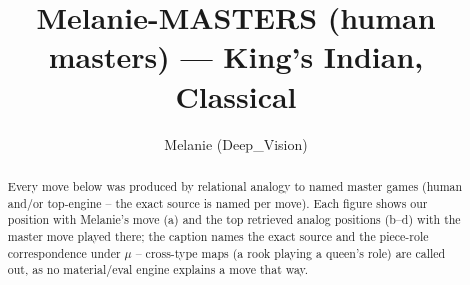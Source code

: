 \documentclass[11pt]{article}
\title{Melanie-MASTERS (human masters) — King's Indian, Classical}
\author{Melanie (Deep\_Vision)}
\date{}
\begin{document}
\maketitle

\begin{abstract}Every move below was produced by relational analogy to named master games (human and/or top-engine -- the exact source is named per move). Each figure shows our position with Melanie's move (a) and the top retrieved analog positions (b--d) with the master move played there; the caption names the exact source and the piece-role correspondence under $\mu$ -- cross-type maps (a rook playing a queen's role) are called out, as no material/eval engine explains a move that way.\end{abstract}

\begin{figure}[p]\centering
\begin{subfigure}{0.46\textwidth}\centering
\resizebox{\linewidth}{!}{%
\newchessgame
\chessboard[
  setfen={rnbq1rk1/ppp2pbp/3p1np1/4p3/2PPP3/2N2N2/PP2BPPP/R1BQ1RK1 b - - 1 7},
  showmover=false,
  pgfstyle=straightmove, color=movearrow, markmove={e5-d4}
]}
\caption{}
\end{subfigure}\hfill
\begin{subfigure}{0.46\textwidth}\centering
\resizebox{\linewidth}{!}{%
\newchessgame
\chessboard[
  setfen={r2q1rk1/pp1bbppp/2n1pn2/3p4/3PP3/5NP1/PP3PBP/RNBQR1K1 w - - 0 11},
  showmover=false,
  pgfstyle=straightmove, color=movearrow, markmove={e4-e5}
]}
\caption{}
\end{subfigure}
\\[4pt]
\begin{subfigure}{0.46\textwidth}\centering
\resizebox{\linewidth}{!}{%
\newchessgame
\chessboard[
  setfen={r1bq1rk1/pp2bppp/2n2n2/8/1p1p4/P2P1NP1/4PPBP/RNBQ1RK1 w - - 0 11},
  showmover=false,
  pgfstyle=straightmove, color=movearrow, markmove={a3-b4}
]}
\caption{}
\end{subfigure}\hfill
\begin{subfigure}{0.46\textwidth}\centering
\resizebox{\linewidth}{!}{%
\newchessgame
\chessboard[
  setfen={r1bq1rk1/ppp2nbp/n2p1pp1/4p3/1PPPP3/2N2N2/P3BPPP/1RBQ1RK1 b - - 0 12},
  showmover=false,
  pgfstyle=straightmove, color=movearrow, markmove={d8-e7}
]}
\caption{}
\end{subfigure}

\end{figure}
\end{document}

